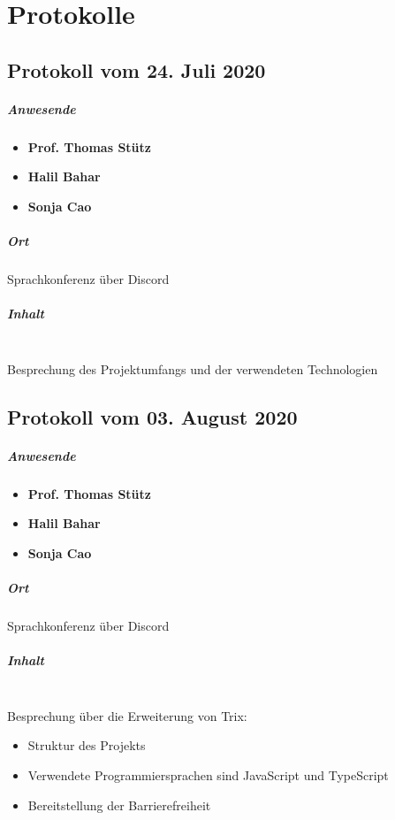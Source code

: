 \chapter{Protokolle}
\section{Protokoll vom 24. Juli 2020}
\paragraph{Anwesende}
\begin{itemize}
	\item{\textbf{Prof. Thomas Stütz}}
	\item{\textbf{Halil Bahar}}
	\item{\textbf{Sonja Cao}}
\end{itemize}

\paragraph{Ort}
Sprachkonferenz über Discord

\paragraph{Inhalt}\mbox{}\\
Besprechung des Projektumfangs und der verwendeten Technologien

\section{Protokoll vom 03. August 2020}

\paragraph{Anwesende}
\begin{itemize}
	\item{\textbf{Prof. Thomas Stütz}}
	\item{\textbf{Halil Bahar}}
	\item{\textbf{Sonja Cao}}
\end{itemize}

\paragraph{Ort}
Sprachkonferenz über Discord

\paragraph{Inhalt}\mbox{}\\
Besprechung über die Erweiterung von Trix:
\begin{itemize}
	\item{Struktur des Projekts}
	\item{Verwendete Programmiersprachen sind JavaScript und TypeScript}
	\item{Bereitstellung der Barrierefreiheit}
\end{itemize}

